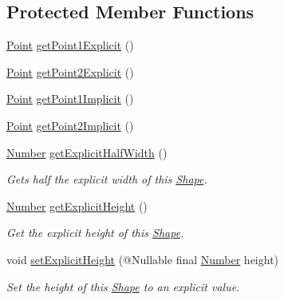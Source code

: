 \subsection*{Protected Member Functions}
\begin{DoxyCompactItemize}
\item 
\hyperlink{classcom_1_1aarrelaakso_1_1drawl_1_1_point}{Point} \hyperlink{classcom_1_1aarrelaakso_1_1drawl_1_1_line_ac8344112f3a5d24cfa4b732f3625af08}{get\+Point1\+Explicit} ()
\item 
\hyperlink{classcom_1_1aarrelaakso_1_1drawl_1_1_point}{Point} \hyperlink{classcom_1_1aarrelaakso_1_1drawl_1_1_line_a1f2be99b388cc8bfb6f2bb866c21138f}{get\+Point2\+Explicit} ()
\item 
\hyperlink{classcom_1_1aarrelaakso_1_1drawl_1_1_point}{Point} \hyperlink{classcom_1_1aarrelaakso_1_1drawl_1_1_line_a687f4da61c3f8760840713ff2da6ecaa}{get\+Point1\+Implicit} ()
\item 
\hyperlink{classcom_1_1aarrelaakso_1_1drawl_1_1_point}{Point} \hyperlink{classcom_1_1aarrelaakso_1_1drawl_1_1_line_a275e3535223921a66570a24d8a648586}{get\+Point2\+Implicit} ()
\item 
\hyperlink{interfacecom_1_1aarrelaakso_1_1drawl_1_1_number}{Number} \hyperlink{classcom_1_1aarrelaakso_1_1drawl_1_1_shape_a3acdc2fd1944e2efacd0bfbb8aefe89b}{get\+Explicit\+Half\+Width} ()
\begin{DoxyCompactList}\small\item\em Gets half the explicit width of this \hyperlink{classcom_1_1aarrelaakso_1_1drawl_1_1_shape}{Shape}. \end{DoxyCompactList}\item 
\hyperlink{interfacecom_1_1aarrelaakso_1_1drawl_1_1_number}{Number} \hyperlink{classcom_1_1aarrelaakso_1_1drawl_1_1_shape_a48917787cedbfd447cd37edbb59a1145}{get\+Explicit\+Height} ()
\begin{DoxyCompactList}\small\item\em Get the explicit height of this \hyperlink{classcom_1_1aarrelaakso_1_1drawl_1_1_shape}{Shape}. \end{DoxyCompactList}\item 
void \hyperlink{classcom_1_1aarrelaakso_1_1drawl_1_1_shape_a3680a63cef0d766132d1f64813ca8eca}{set\+Explicit\+Height} (@Nullable final \hyperlink{interfacecom_1_1aarrelaakso_1_1drawl_1_1_number}{Number} height)
\begin{DoxyCompactList}\small\item\em Set the height of this \hyperlink{classcom_1_1aarrelaakso_1_1drawl_1_1_shape}{Shape} to an explicit value. \end{DoxyCompactList}\item 

\end{DoxyCompactItemize}
